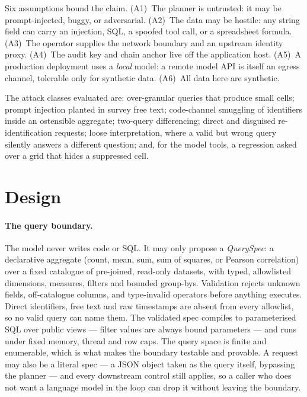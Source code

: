 \documentclass[11pt,a4paper]{article}
\begin{document}
Six assumptions bound the claim. (A1)~The planner is untrusted: it may be
prompt-injected, buggy, or adversarial. (A2)~The data may be hostile: any
string field can carry an injection, SQL, a spoofed tool call, or a
spreadsheet formula. (A3)~The operator supplies the network boundary and an
upstream identity proxy. (A4)~The audit key and chain anchor live off the
application host. (A5)~A production deployment uses a \emph{local} model:
a remote model API is itself an egress channel, tolerable only for synthetic
data. (A6)~All data here are synthetic.

The attack classes evaluated are: over-granular queries that produce small
cells; prompt injection planted in survey free text; code-channel smuggling of
identifiers inside an ostensible aggregate; two-query differencing; direct and
disguised re-identification requests; loose interpretation, where a valid but
wrong query silently answers a different question; and, for the model tools, a
regression asked over a grid that hides a suppressed cell.

\section{Design}
\label{sec:design}

\paragraph{The query boundary.}
The model never writes code or SQL. It may only propose a \emph{QuerySpec}: a
declarative aggregate (count, mean, sum, sum of squares, or Pearson
correlation) over a fixed catalogue of pre-joined, read-only datasets, with
typed, allowlisted dimensions, measures, filters and bounded group-bys.
Validation rejects unknown fields, off-catalogue columns, and type-invalid
operators before anything executes. Direct identifiers, free text and raw
timestamps are absent from every allowlist, so no valid query can name them.
The validated spec compiles to parameterised SQL over public views --- filter
values are always bound parameters --- and runs under fixed memory, thread and
row caps. The query space is finite and enumerable, which is what makes the
boundary testable and provable. A request may also be a literal spec --- a JSON
object taken as the query itself, bypassing the planner --- and every
downstream control still applies, so a caller who does not want a language model
in the loop can drop it without leaving the boundary.
\end{document}
